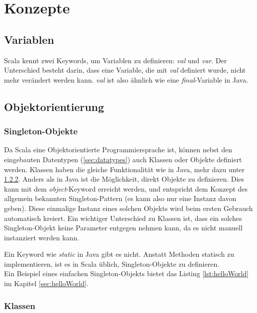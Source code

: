 \chapter{Konzepte}

\section{Variablen}

Scala kennt zwei Keywords, um Variablen zu definieren: \emph{val} und 
\emph{var}. Der Unterschied besteht darin, dass eine Variable, die mit
\emph{val} definiert wurde, nicht mehr verändert werden kann. \emph{val}
ist also ähnlich wie eine \emph{final}-Variable in Java.

\section{Objektorientierung}

\subsection{Singleton-Objekte}

Da Scala eine Objektorientierte Programmiersprache ist, können nebst
den eingebauten Datentypen (\ref{sec:datatypes}) auch Klassen oder
Objekte definiert werden. Klassen haben die gleiche Funktionalität
wie in Java, mehr dazu unter \ref{sec:classes}.  Anders als in Java
ist die Möglichkeit, direkt Objekte zu definieren.  Dies kann mit dem
\emph{object}-Keyword erreicht werden, und entspricht dem Konzept des
allgemein bekannten Singleton-Pattern (es kann also nur eine Instanz davon
geben). Diese einmalige Instanz eines solchen Objekts wird beim ersten
Gebrauch automatisch kreiert. Ein wichtiger Unterschied zu Klassen ist,
dass ein solches Singleton-Objekt keine Parameter entgegen nehmen kann,
da es nicht manuell instanziert werden kann.

Ein Keyword wie \emph{static} in Java gibt es nicht. Anstatt Methoden
statisch zu implementieren, ist es in Scala üblich, Singleton-Objekte
zu definieren.\\

Ein Beispiel eines einfachen Singleton-Objekts bietet das Listing
\ref{lst:helloWorld} im Kapitel \ref{sec:helloWorld}.

\subsection{Klassen}
\label{sec:classes}

